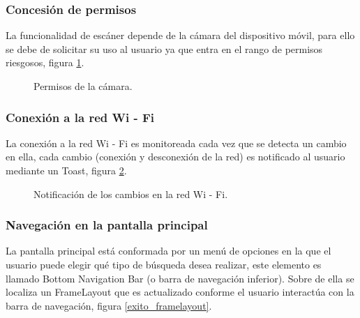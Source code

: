 \subsubsection{Concesión de permisos}

La funcionalidad de escáner depende de la cámara del dispositivo móvil, para ello se debe de solicitar su uso al usuario ya que entra en el rango de permisos riesgosos, figura \ref{exito_permisos_camara}.

\begin{figure}[!h]
	\centering
	\caption{Permisos de la cámara.}
	\label{exito_permisos_camara}
\end{figure}

\subsubsection{Conexión a la red Wi - Fi}
La conexión a la red Wi - Fi es monitoreada cada vez que se detecta un cambio en ella, cada cambio (conexión y desconexión de la red) es notificado al usuario mediante un Toast, figura \ref{exito_toast_wifi}.

\begin{figure}[!h]
	\centering
	\caption{Notificación de los cambios en la red Wi - Fi.}
	\label{exito_toast_wifi}
\end{figure}

\subsubsection{Navegación en la pantalla principal}
La pantalla principal está conformada por un menú de opciones en la que el usuario puede elegir qué tipo de búsqueda desea realizar, este elemento es llamado Bottom Navigation Bar (o barra de navegación inferior). Sobre de ella se localiza un FrameLayout que es actualizado conforme el usuario interactúa con la barra de navegación, figura \ref{exito_framelayout}.

